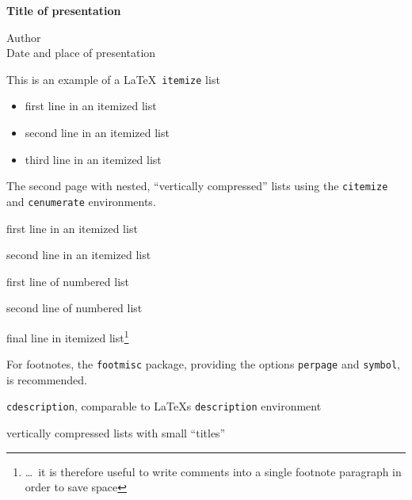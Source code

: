 \documentclass[12pt,pdftex,sansfont,4x3]{elpres}
\begin{document}
\begin{titlepage}
  \centering
  {
    \Huge \bfseries \textcolor{eptitlecolor}{Title of presentation} \par
  }
  \vspace{1.3ex} \large
  Author\\[2ex]Date and place of presentation
\end{titlepage}

\begin{psli}
This is an example of a \LaTeX\ \texttt{itemize} list 

\begin{itemize}
   \item first line in an itemized list
   \item second line in an itemized list
   \item third line in an itemized list
\end{itemize}

\end{psli}

\begin{psli}
The second page with nested, ``vertically compressed'' lists using the
\texttt{citemize} and \texttt{cenumerate} environments.

\begin{citemize}
   \item first line in an itemized list
   \item second line in an itemized list
   \begin{cenumerate}
      \item first line of numbered list
      \item second line of numbered list
   \end{cenumerate}
   \item final line in itemized list\footnote{\dots\ it is therefore
       useful to write comments into a single footnote paragraph in order
       to save space}
\end{citemize}

{\small For footnotes, the \texttt{footmisc} package, providing the
  options \texttt{perpage} and \texttt{symbol}, is recommended. \par}
\end{psli}

\begin{psli}

  \begin{cdescription}
\item[environment name:] \texttt{cdescription}, comparable to
    \LaTeX s \texttt{des\-cription} environment
   \item[used for:] vertically compressed lists with small ``titles''
\end{cdescription}

\end{psli}
\end{document}
